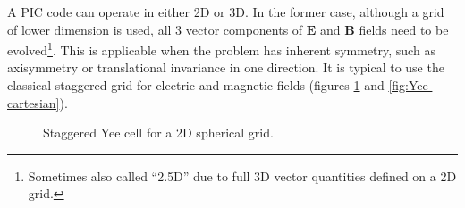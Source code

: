 A PIC code can operate in either 2D or 3D. In the former case, although a grid
of lower dimension is used, all 3 vector components of $\mathbf{E}$ and
$\mathbf{B}$ fields need to be evolved\footnote{Sometimes also called ``2.5D''
  due to full 3D vector quantities defined on a 2D grid.}. This is applicable
when the problem has inherent symmetry, such as axisymmetry or translational
invariance in one direction. It is typical to use the classical staggered
\citet{yee_numerical_1966} grid for electric and magnetic fields (figures
\ref{fig:Yee} and \ref{fig:Yee-cartesian}).

\begin{figure}[h]
  \centering
  \caption{Staggered Yee cell for a 2D spherical grid.}
  \label{fig:Yee}
\end{figure}


